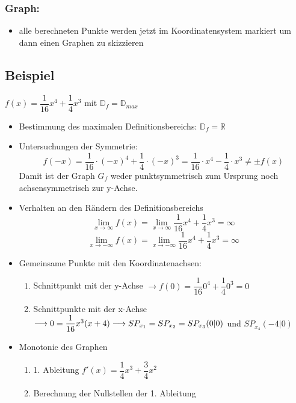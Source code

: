 \documentclass[a4paper,twocolumn,10pt]{onepgnote1}
\begin{document}
 \subsubsection{Graph:}
 \begin{itemize}
     \item alle berechneten Punkte werden jetzt im Koordinatensystem markiert um dann einen Graphen zu skizzieren
      \end{itemize}
   \subsection{Beispiel} 
   $f(x)= \dfrac{1}{16} x^4 +\dfrac{1}{4} x^3$ mit $\mathds{D}_f =\mathds{D}_{max}$ 
     \begin{itemize}
         \item Bestimmung des maximalen Definitionsbereichs: $\mathds{D}_f = \mathds{R}$ 
         \item Untersuchungen der Symmetrie:
    $$f(-x) = \frac{1}{16} \cdot (-x)^4 + \frac{1}{4} \cdot (-x)^3 = \frac{1}{16} \cdot x^4 - \frac{1}{4} \cdot x^3 \neq \pm f(x)$$ Damit ist der Graph $G_f$ weder punktsymmetrisch zum Ursprung noch achsensymmetrisch zur y-Achse.
    \item Verhalten an den Rändern des Definitionsbereichs
    $$\lim_{x\rightarrow \infty} f(x) = \lim_{x\rightarrow \infty} \dfrac{1}{16}x^4 +\dfrac{1}{4}x^3 = \infty$$
        $$\lim_{x\rightarrow -\infty} f(x) = \lim_{x\rightarrow -\infty} \dfrac{1}{16}x^4 +\dfrac{1}{4}x^3 = \infty$$
    \item Gemeinsame Punkte mit den Koordinatenachsen:\\
    \begin{enumerate}
    \item Schnittpunkt mit der y-Achse $\longrightarrow f(0) = \dfrac{1}{16}0^4 +\dfrac{1}{4}0^3 = 0$ \\
    \item Schnittpunkte mit der x-Achse $\longrightarrow 0 = \dfrac{1}{16} x^3 (x+4) \\\longrightarrow SP_{x_1} = SP_{x_2} = SP_{x_3}(0|0)$ und $SP_{x_4}(-4|0)$
    \end{enumerate}
    \item Monotonie des Graphen\\
    \begin{enumerate}
    \item 1. Ableitung $f'(x)= \dfrac{1}{4} x^3 +\dfrac{3}{4} x^2$\\
    \item Berechnung der Nullstellen der 1. Ableitung\\

\end{enumerate}
\end{itemize}
\end{document}
